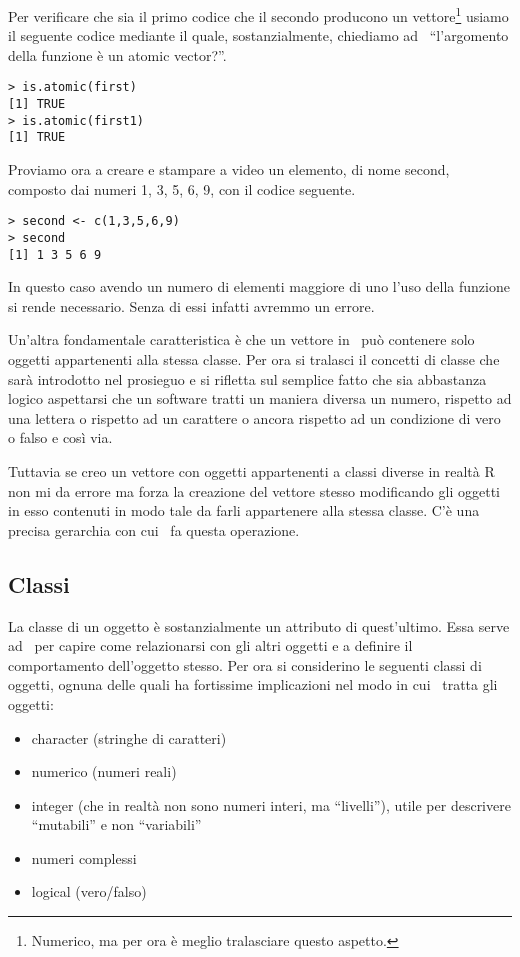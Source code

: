 Per verificare che sia il primo codice che il secondo producono un vettore\footnote{Numerico, ma per ora è meglio tralasciare questo aspetto.} usiamo il seguente codice mediante il quale, sostanzialmente, chiediamo ad \erre\  ``l'argomento della funzione  è un atomic vector?''.
\begin{lstlisting}
> is.atomic(first)
[1] TRUE
> is.atomic(first1)
[1] TRUE
\end{lstlisting}

Proviamo ora a creare e stampare a video un elemento, di nome second, composto dai numeri 1, 3, 5, 6, 9, con il codice seguente.
\begin{lstlisting}
> second <- c(1,3,5,6,9)
> second
[1] 1 3 5 6 9
\end{lstlisting}

In questo caso avendo un numero di elementi maggiore di uno l'uso della funzione  si rende necessario. Senza di essi infatti avremmo un errore.

Un'altra fondamentale caratteristica è che un vettore in \erre\ può contenere solo oggetti appartenenti alla stessa classe. Per ora si tralasci il concetti di classe che sarà introdotto nel prosieguo e si rifletta sul semplice fatto che sia abbastanza logico aspettarsi che un software tratti un maniera diversa un numero, rispetto ad una lettera o rispetto ad un carattere o ancora rispetto ad un condizione di vero o falso e così via.

Tuttavia se creo un vettore con oggetti appartenenti a classi diverse in realtà R non mi da errore ma forza la creazione del vettore stesso modificando gli oggetti in esso contenuti in modo tale da farli appartenere alla stessa classe. C’è una precisa gerarchia con cui \erre\ fa questa operazione.

\subsection{Classi}

La classe di un oggetto è sostanzialmente un attributo di quest'ultimo. Essa serve ad \erre\ per capire come relazionarsi con gli altri oggetti e a definire il comportamento dell'oggetto stesso. Per ora si considerino le seguenti classi di oggetti, ognuna delle quali ha fortissime implicazioni nel modo in cui \erre\ tratta gli oggetti:

\begin{itemize}
\item character (stringhe di caratteri)
\item numerico (numeri reali)
\item integer (che in realtà non sono numeri interi, ma ``livelli''), utile per descrivere ``mutabili'' e non ``variabili''
\item numeri complessi
\item logical (vero/falso)
\end{itemize}

